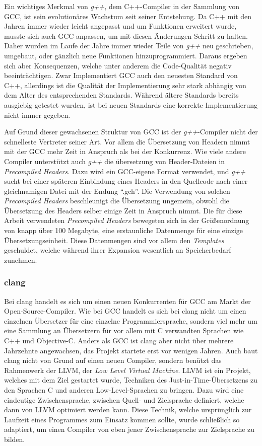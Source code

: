 Ein wichtiges Merkmal von \textit{g++}, dem C++-Compiler in der Sammlung von GCC, ist sein evolutionäres Wachstum seit seiner Entstehung. Da C++ mit den Jahren immer wieder leicht angepasst und um Funktionen
erweitert wurde, musste sich auch GCC anpassen, um mit diesen Änderungen Schritt zu halten. Daher wurden im Laufe der Jahre immer wieder Teile von \textit{g++} neu geschrieben, umgebaut, oder gänzlich
neue Funktionen hinzuprogrammiert. Daraus ergeben sich aber Konsequenzen, welche unter anderem die Code-Qualität negativ beeinträchtigen. Zwar Implementiert GCC auch den neuesten Standard von C++, allerdings
ist die Qualität der Implementierung sehr stark abhängig von dem Alter des entsprechenden Standards. Während ältere Standards bereits ausgiebig getestet wurden, ist bei neuen Standards eine korrekte 
Implementierung nicht immer gegeben. 

Auf Grund dieser gewachsenen Struktur von GCC ist der \textit{g++}-Compiler nicht der schnelleste Vertreter seiner Art. Vor allem die Übersetzung von Headern nimmt mit der GCC mehr Zeit in Anspruch als
bei der Konkurrenz. Wie viele andere Compiler unterstützt auch \textit{g++} die übersetzung von Header-Dateien in \textit{Precompiled Headers}. Dazu wird ein GCC-eigene Format verwendet, und \textit{g++} sucht bei einer
späteren Einbindung eines Headers in den Quellcode nach einer gleichnamigen Datei mit der Endung ``.gch''. Die Verwendung von solchen \textit{Precompiled Headers} beschleunigt die Übersetzung ungemein, 
obwohl die Übersetzung des Headers selber einige Zeit in Anspruch nimmt. Die für diese Arbeit verwendeten \textit{Precompiled Headers} bewegeten sich in der Größenordnung von knapp über 100 Megabyte, 
eine erstaunliche Datenmenge für eine einzige Übersetzungseinheit. Diese Datenmengen sind vor allem den \textit{Templates} geschuldet, welche während ihrer Expansion wesentlich an Speicherbedarf zunehmen.

\subsubsection{clang}
Bei clang handelt es sich um einen neuen Konkurrenten für GCC am Markt der Open-Source-Compiler. Wie bei GCC handelt es sich bei clang nicht um einen einzelnen Übersetzer für eine einzelne Programmiersprache,
sondern viel mehr um eine Sammlung an Übersetzern für vor allem mit C verwandten Sprachen wie C++ und Objective-C. Anders als GCC ist clang aber nicht über mehrere Jahrzehnte angewachsen, das Projekt
startete erst vor wenigen Jahren. Auch baut clang nicht von Grund auf einen neuen Compiler, sondern benützt das Rahmenwerk der LLVM, der \textit{Low Level Virtual Machine}. LLVM ist ein Projekt, welches
mit dem Ziel gestartet wurde, Techniken des Just-in-Time-Übersetzens zu den Sprachen C und anderen Low-Level-Sprachen zu bringen. Dazu wird eine eindeutige Zwischensprache, zwischen Quell- und Zielsprache
definiert, welche dann von LLVM optimiert werden kann. Diese Technik, welche ursprünglich zur Laufzeit eines Programmes zum Einsatz kommen sollte, wurde schließlich so adaptiert, um einen Compiler von
eben jener Zwischensprache zur Zielsprache zu bilden. 

